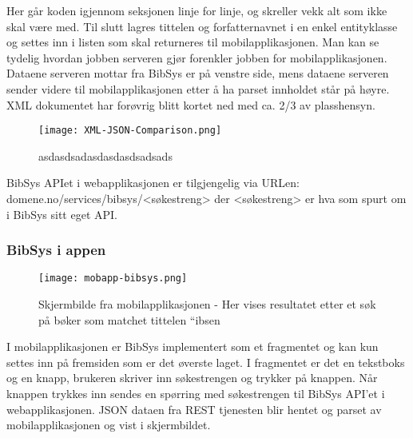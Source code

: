 \documentclass[../main.tex]{subfiles}
\begin{document}
Her går koden igjennom seksjonen linje for linje, og skreller vekk alt som ikke skal være med. Til slutt lagres tittelen og forfatternavnet i en enkel entityklasse og settes inn i listen som skal returneres til mobilapplikasjonen.\newline
\newline
Man kan se tydelig hvordan jobben serveren gjør forenkler jobben for mobilapplikasjonen. Dataene serveren mottar fra BibSys er på venstre side, mens dataene serveren sender videre til mobilapplikasjonen etter å ha parset innholdet står på høyre. XML dokumentet har forøvrig blitt kortet ned med ca. 2/3 av plasshensyn.

\begin{figure}[H]
  \centering
  \texttt{[image: XML-JSON-Comparison.png]}
  \caption{asdasdsadasdasdasdsadsads}
\end{figure}

BibSys APIet i webapplikasjonen er tilgjengelig via URLen: domene.no/services/bibsys/<søkestreng> der <søkestreng> er hva som spurt om i BibSys sitt eget API.

\subsubsection{BibSys i appen}

\begin{figure}[H]
  \centering
  \texttt{[image: mobapp-bibsys.png]}
  \caption{Skjermbilde fra mobilapplikasjonen - Her vises resultatet etter et søk på bøker som matchet tittelen “ibsen}
\end{figure}

I mobilapplikasjonen er BibSys implementert som et fragmentet og kan kun settes inn på fremsiden som er det øverste laget. I fragmentet er det en tekstboks og en knapp, brukeren skriver inn søkestrengen og trykker på knappen. Når knappen trykkes inn sendes en spørring med søkestrengen til BibSys API’et i webapplikasjonen. JSON dataen fra REST tjenesten blir hentet og parset av mobilapplikasjonen og vist i skjermbildet.

\newpage
\end{document}
